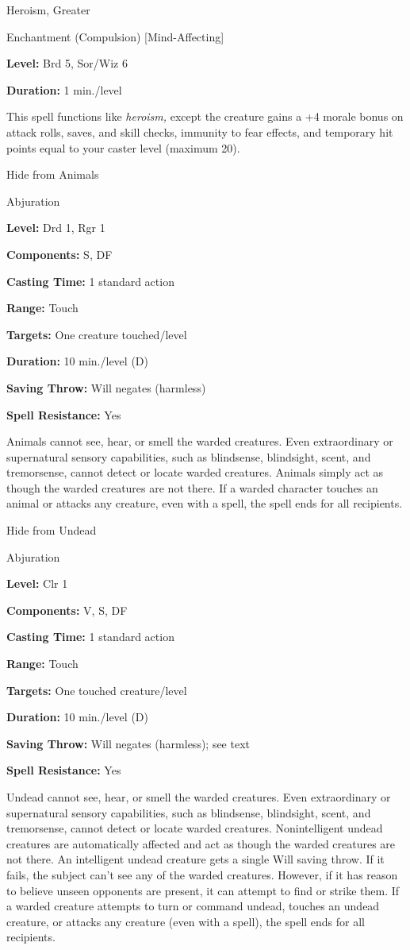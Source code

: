 \documentclass{article}
\begin{document}
\vspace{12pt}
Heroism, Greater

Enchantment (Compulsion) [Mind-Affecting]

\textbf{Level:} Brd 5, Sor/Wiz 6

\textbf{Duration:} 1 min./level

This spell functions like \textit{heroism, }except the creature gains a +4 morale 
bonus on attack rolls, saves, and skill checks, immunity to fear effects, and temporary 
hit points equal to your caster level (maximum 20).

\vspace{12pt}
Hide from Animals

Abjuration

\textbf{Level:} Drd 1, Rgr 1

\textbf{Components:} S, DF

\textbf{Casting Time:} 1 standard action

\textbf{Range:} Touch

\textbf{Targets:} One creature touched/level

\textbf{Duration:} 10 min./level (D)

\textbf{Saving Throw: }Will negates (harmless)

\textbf{Spell Resistance:} Yes

Animals cannot see, hear, or smell the warded creatures. Even extraordinary or 
supernatural sensory capabilities, such as blindsense, blindsight, scent, and tremorsense, 
cannot detect or locate warded creatures. Animals simply act as though the warded 
creatures are not there. If a warded character touches an animal or attacks any 
creature, even with a spell, the spell ends for all recipients.

\vspace{12pt}
Hide from Undead

Abjuration

\textbf{Level:} Clr 1

\textbf{Components:} V, S, DF

\textbf{Casting Time:} 1 standard action

\textbf{Range:} Touch

\textbf{Targets:} One touched creature/level

\textbf{Duration:} 10 min./level (D)

\textbf{Saving Throw: }Will negates (harmless); see text

\textbf{Spell Resistance:} Yes

Undead cannot see, hear, or smell the warded creatures. Even extraordinary or supernatural 
sensory capabilities, such as blindsense, blindsight, scent, and tremorsense, cannot 
detect or locate warded creatures. Nonintelligent undead creatures are automatically 
affected and act as though the warded creatures are not there. An intelligent undead 
creature gets a single Will saving throw. If it fails, the subject can't see any 
of the warded creatures. However, if it has reason to believe unseen opponents 
are present, it can attempt to find or strike them. If a warded creature attempts 
to turn or command undead, touches an undead creature, or attacks any creature 
(even with a spell), the spell ends for all recipients.
\end{document}
